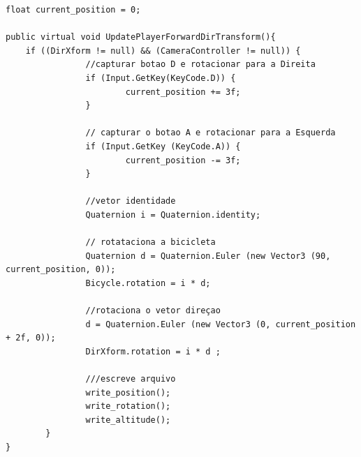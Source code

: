 \begin{lstlisting}
float current_position = 0;

public virtual void UpdatePlayerForwardDirTransform(){
	if ((DirXform != null) && (CameraController != null)) {
				//capturar botao D e rotacionar para a Direita
				if (Input.GetKey(KeyCode.D)) {
						current_position += 3f;
				}

				// capturar o botao A e rotacionar para a Esquerda
				if (Input.GetKey (KeyCode.A)) {
						current_position -= 3f;
				}

				//vetor identidade
				Quaternion i = Quaternion.identity;

				// rotataciona a bicicleta
				Quaternion d = Quaternion.Euler (new Vector3 (90, current_position, 0));
				Bicycle.rotation = i * d;

				//rotaciona o vetor direçao
				d = Quaternion.Euler (new Vector3 (0, current_position + 2f, 0));
				DirXform.rotation = i * d ;

				///escreve arquivo 
				write_position();
				write_rotation();
				write_altitude();
		}
}
\end{lstlisting}

